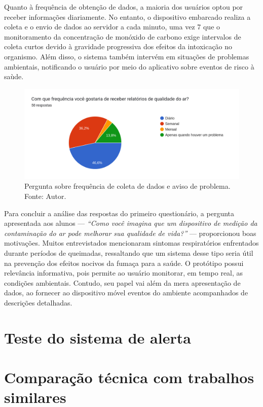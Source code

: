 Quanto à frequência de obtenção de dados, a maioria dos usuários optou por receber informações diariamente. No entanto, o dispositivo embarcado realiza a coleta e o envio de dados ao servidor a cada minuto, uma vez 7
que o monitoramento da concentração de monóxido de carbono exige intervalos de coleta curtos devido à gravidade progressiva dos efeitos da intoxicação no organismo. Além disso, o sistema também intervém em situações 
de problemas ambientais, notificando o usuário por meio do aplicativo sobre eventos de risco à saùde.

\begin{figure}[ht]
    \centering
    \includegraphics[width=.64\textwidth]{img/questionario/1/graf-info-frequencia.png}
    \caption{Pergunta sobre frequência de coleta de dados e aviso de problema. Fonte: Autor.}\label{grafFrequenciaInfo}
\end{figure}

Para concluir a análise das respostas do primeiro questionário, a pergunta apresentada aos alunos — \textit{``Como você imagina que um dispositivo de medição da contaminação do ar pode melhorar sua qualidade de vida?''} — proporcionou boas motivações. Muitos 
entrevistados mencionaram sintomas respiratórios enfrentados durante períodos de queimadas, ressaltando que um sistema desse tipo seria útil na prevenção dos efeitos nocivos da fumaça para a saúde. O protótipo possui 
relevância informativa, pois permite ao usuário monitorar, em tempo real, as condições ambientais. Contudo, seu papel vai além da mera apresentação de dados, ao fornecer ao dispositivo móvel eventos do ambiente 
acompanhados de descrições detalhadas.



\section{Teste do sistema de alerta}\label{alerta}

\section{Comparação técnica com trabalhos similares}\label{comparacao}